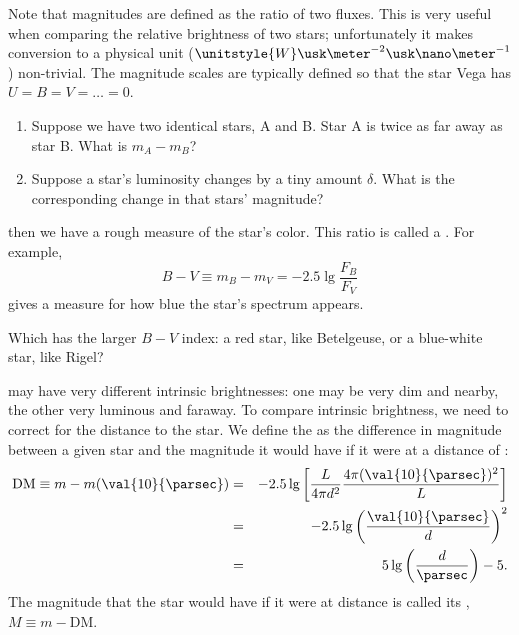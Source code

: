 Note that magnitudes are defined as the ratio of two fluxes. This is very useful when comparing the relative brightness of two stars; unfortunately it makes conversion to a physical unit ($\unitstyle{W}\usk\meter^{-2}\usk\nano\meter^{-1}$) non-trivial.  The magnitude scales are typically defined so that the star Vega has $U=B=V=\ldots=0$.


\newpage
\begin{exercisebox}
\begin{enumerate} 
\item Suppose we have two identical stars, A and B. Star A is twice as far away as star B. What is $m_{A} - m_{B}$?
\item Suppose a star's luminosity changes by a tiny amount $\delta$.  What is the corresponding change in that stars' magnitude?
\end{enumerate}
\end{exercisebox}

 then we have a rough measure of the star's color.  This ratio is called a .  For example, 
\[ B - V \equiv m_{B} - m_{V} = -2.5\lg\frac{F_{B}}{F_{V}} \]
gives a measure for how blue the star's spectrum appears.

\begin{exercisebox}
Which has the larger $B-V$ index: a red star, like Betelgeuse, or a blue-white star, like Rigel?
\end{exercisebox}

 may have very different intrinsic brightnesses: one may be very dim and nearby, the other very luminous and faraway.  To compare intrinsic brightness, we need to correct for the distance to the star.  We define the  as the difference in magnitude between a given star and the magnitude it would have if it were at a distance of :
\begin{eqnarray*}
 \mathrm{DM} \equiv m - m(\val{10}{\parsec}) &=& -2.5\lg\left[\frac{L}{4\pi d^{2}} \frac{4\pi (\val{10}{\parsec})^{2}}{L}\right] \\
 	&=& -2.5\lg\left(\frac{\val{10}{\parsec}}{d}\right)^{2} \\
	&=& 5\lg\left(\frac{d}{\parsec}\right) - 5.
\end{eqnarray*}
The magnitude that the star would have if it were at  distance is called its , $M \equiv m - \mathrm{DM}$.

